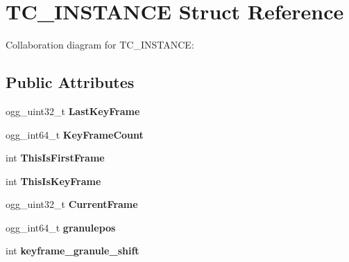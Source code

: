 \hypertarget{struct_t_c___i_n_s_t_a_n_c_e}{\section{T\+C\+\_\+\+I\+N\+S\+T\+A\+N\+C\+E Struct Reference}
\label{struct_t_c___i_n_s_t_a_n_c_e}
}


Collaboration diagram for T\+C\+\_\+\+I\+N\+S\+T\+A\+N\+C\+E\+:
\subsection*{Public Attributes}
\begin{DoxyCompactItemize}
\item 
\hypertarget{struct_t_c___i_n_s_t_a_n_c_e_a141c9baf041e7c09a7b3302677f5b3f5}{ogg\+\_\+uint32\+\_\+t {\bfseries Last\+Key\+Frame}}\label{struct_t_c___i_n_s_t_a_n_c_e_a141c9baf041e7c09a7b3302677f5b3f5}

\item 
\hypertarget{struct_t_c___i_n_s_t_a_n_c_e_a884cbcd0c6852584b037dd703f56432e}{ogg\+\_\+int64\+\_\+t {\bfseries Key\+Frame\+Count}}\label{struct_t_c___i_n_s_t_a_n_c_e_a884cbcd0c6852584b037dd703f56432e}

\item 
\hypertarget{struct_t_c___i_n_s_t_a_n_c_e_ae0ca09e86beed779eaf9d31c669899d6}{int {\bfseries This\+Is\+First\+Frame}}\label{struct_t_c___i_n_s_t_a_n_c_e_ae0ca09e86beed779eaf9d31c669899d6}

\item 
\hypertarget{struct_t_c___i_n_s_t_a_n_c_e_a6a3cae33bea1ef7e83a8bbc54dc4a717}{int {\bfseries This\+Is\+Key\+Frame}}\label{struct_t_c___i_n_s_t_a_n_c_e_a6a3cae33bea1ef7e83a8bbc54dc4a717}

\item 
\hypertarget{struct_t_c___i_n_s_t_a_n_c_e_a4f24beb667c90cf8a8e791880faa883c}{ogg\+\_\+uint32\+\_\+t {\bfseries Current\+Frame}}\label{struct_t_c___i_n_s_t_a_n_c_e_a4f24beb667c90cf8a8e791880faa883c}

\item 
\hypertarget{struct_t_c___i_n_s_t_a_n_c_e_a848c9ef21f1a4015976245ed45958028}{ogg\+\_\+int64\+\_\+t {\bfseries granulepos}}\label{struct_t_c___i_n_s_t_a_n_c_e_a848c9ef21f1a4015976245ed45958028}

\item 
\hypertarget{struct_t_c___i_n_s_t_a_n_c_e_a724a56f07f03e245e3656b327f6441f0}{int {\bfseries keyframe\+\_\+granule\+\_\+shift}}\label{struct_t_c___i_n_s_t_a_n_c_e_a724a56f07f03e245e3656b327f6441f0}


\end{DoxyCompactItemize}
